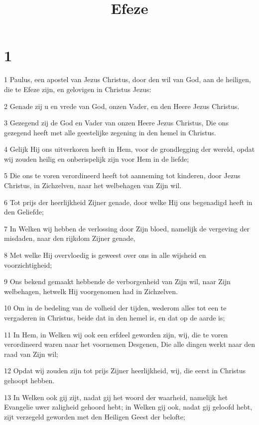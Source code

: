 

\title{Efeze}



\chapter{1}

\par 1 Paulus, een apostel van Jezus Christus, door den wil van God, aan de heiligen, die te Efeze zijn, en gelovigen in Christus Jezus:
\par 2 Genade zij u en vrede van God, onzen Vader, en den Heere Jezus Christus.
\par 3 Gezegend zij de God en Vader van onzen Heere Jezus Christus, Die ons gezegend heeft met alle geestelijke zegening in den hemel in Christus.
\par 4 Gelijk Hij ons uitverkoren heeft in Hem, voor de grondlegging der wereld, opdat wij zouden heilig en onberispelijk zijn voor Hem in de liefde;
\par 5 Die ons te voren verordineerd heeft tot aanneming tot kinderen, door Jezus Christus, in Zichzelven, naar het welbehagen van Zijn wil.
\par 6 Tot prijs der heerlijkheid Zijner genade, door welke Hij ons begenadigd heeft in den Geliefde;
\par 7 In Welken wij hebben de verlossing door Zijn bloed, namelijk de vergeving der misdaden, naar den rijkdom Zijner genade,
\par 8 Met welke Hij overvloedig is geweest over ons in alle wijsheid en voorzichtigheid;
\par 9 Ons bekend gemaakt hebbende de verborgenheid van Zijn wil, naar Zijn welbehagen, hetwelk Hij voorgenomen had in Zichzelven.
\par 10 Om in de bedeling van de volheid der tijden, wederom alles tot een te vergaderen in Christus, beide dat in den hemel is, en dat op de aarde is;
\par 11 In Hem, in Welken wij ook een erfdeel geworden zijn, wij, die te voren verordineerd waren naar het voornemen Desgenen, Die alle dingen werkt naar den raad van Zijn wil;
\par 12 Opdat wij zouden zijn tot prijs Zijner heerlijkheid, wij, die eerst in Christus gehoopt hebben.
\par 13 In Welken ook gij zijt, nadat gij het woord der waarheid, namelijk het Evangelie uwer zaligheid gehoord hebt; in Welken gij ook, nadat gij geloofd hebt, zijt verzegeld geworden met den Heiligen Geest der belofte;
